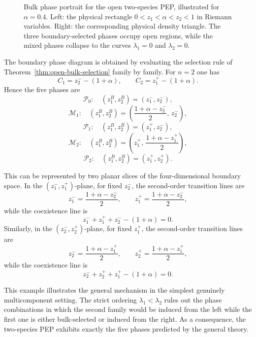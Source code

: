 \documentclass[12pt]{article}
\begin{document}
\begin{figure}[h!]
\caption{Bulk phase portrait for the open two-species PEP, illustrated
for $\alpha=0.4$. Left: the physical rectangle
$0<z_1<\alpha<z_2<1$ in Riemann variables. Right: the corresponding
physical density triangle. The three boundary-selected phases occupy open
regions, while the mixed phases collapse to the curves
$\lambda_1=0$ and $\lambda_2=0$.}
\label{fig:pep2-bulk-phases}
\end{figure}




The boundary phase diagram is obtained by evaluating the selection rule of
Theorem~\ref{thm:open-bulk-selection} family by family. For $n=2$ one has
\[
C_1=z_2^--(1+\alpha),
\qquad
C_2=z_1^+-(1+\alpha).
\]
Hence the five phases are
\[
\mathcal P_0:\quad (z_1^B,z_2^B)=(z_1^-,z_2^-),
\]
\[
\mathcal M_1:\quad (z_1^B,z_2^B)=\left(\frac{1+\alpha-z_2^-}{2},\,z_2^-\right),
\]
\[
\mathcal P_1:\quad (z_1^B,z_2^B)=(z_1^+,z_2^-),
\]
\[
\mathcal M_2:\quad (z_1^B,z_2^B)=\left(z_1^+,\,\frac{1+\alpha-z_1^+}{2}\right),
\]
\[
\mathcal P_2:\quad (z_1^B,z_2^B)=(z_1^+,z_2^+).
\]

This can be represented by two planar slices of the four-dimensional
boundary space. In the $(z_1^-,z_1^+)$-plane, for fixed $z_2^-$, the
second-order transition lines are
\[
z_1^- = \frac{1+\alpha-z_2^-}{2},
\qquad
z_1^+ = \frac{1+\alpha-z_2^-}{2},
\]
while the coexistence line is
\[
z_1^-+z_1^+ + z_2^- -(1+\alpha)=0.
\]
Similarly, in the $(z_2^-,z_2^+)$-plane, for fixed $z_1^+$, the
second-order transition lines are
\[
z_2^- = \frac{1+\alpha-z_1^+}{2},
\qquad
z_2^+ = \frac{1+\alpha-z_1^+}{2},
\]
while the coexistence line is
\[
z_2^-+z_2^+ + z_1^+ -(1+\alpha)=0.
\]


This example illustrates the general mechanism in the simplest genuinely
multicomponent setting. The strict ordering $\lambda_1<\lambda_2$ rules
out the phase combinations in which the second family would be induced
from the left while the first one is either bulk-selected or induced from
the right. As a consequence, the two-species PEP exhibits exactly the five
phases predicted by the general theory.
\end{document}
